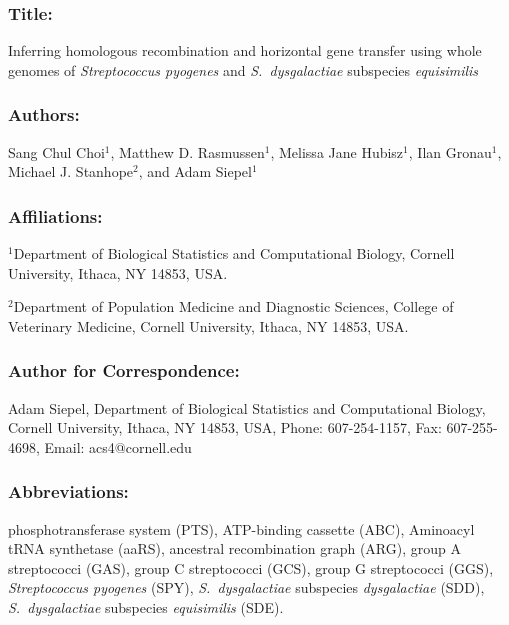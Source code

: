 \documentclass[english]{article}
\newcommand{\lyxaddress}[1]{
\par {\raggedright #1
\vspace{1.4em}
\noindent\par}
}
\begin{document}
\renewcommand\refname{Literature Cited}

\raggedright 


\subsubsection*{Title: }

Inferring homologous recombination and horizontal gene transfer 
using whole genomes of \emph{Streptococcus pyogenes} 
and\emph{ S.\ dysgalactiae} subspecies \emph{equisimilis} 


\subsubsection*{Authors:}

Sang Chul Choi$^{1}$, Matthew D. Rasmussen$^{1}$, Melissa Jane Hubisz$^{1}$, Ilan 
Gronau$^{1}$,
Michael J. Stanhope$^{2}$, and Adam Siepel$^{1}$


\subsubsection*{Affiliations:}


\lyxaddress{$^{1}$Department of Biological Statistics and Computational Biology,
Cornell University, Ithaca, NY 14853, USA.}


\lyxaddress{$^{2}$Department of Population Medicine and Diagnostic Sciences,
College of Veterinary Medicine, Cornell University, Ithaca, NY 14853,
USA.}


\subsubsection*{Author for Correspondence:}

Adam Siepel, Department of Biological Statistics and Computational
Biology, Cornell University, Ithaca, NY 14853, USA, Phone: 607-254-1157,
Fax: 607-255-4698, Email: acs4@cornell.edu\clearpage{}


\subsubsection*{Abbreviations:}

phosphotransferase system (PTS), ATP-binding cassette (ABC), Aminoacyl
tRNA synthetase (aaRS), ancestral recombination graph (ARG), group
A streptococci (GAS), group C streptococci (GCS), group G streptococci
(GGS), \emph{Streptococcus pyogenes} (SPY), \emph{S.\ dysgalactiae}
subspecies \emph{dysgalactiae} (SDD), \emph{S.\ dysgalactiae} subspecies
\emph{equisimilis} (SDE).
\end{document}
